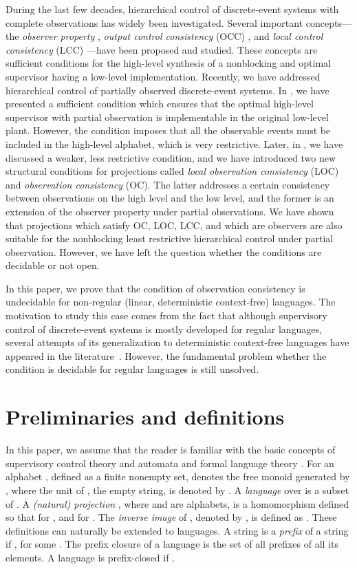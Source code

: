 \documentclass[preprint,1p,times]{elsarticle}
\begin{document}
  During the last few decades, hierarchical control of discrete-event systems with complete observations has widely been investigated. Several important concepts---the {\em observer property\/} \cite{WW96}, {\em output control consistency\/} (OCC) \cite{WZ91}, and {\em local control consistency\/} (LCC) \cite{SB08}---have been proposed and studied. These concepts are sufficient conditions for the high-level synthesis of a nonblocking and optimal supervisor having a low-level implementation. Recently, we have addressed hierarchical control of partially observed discrete-event systems. In \cite{KM10}, we have presented a sufficient condition which ensures that the optimal high-level supervisor with partial observation is implementable in the original low-level plant. However, the condition imposes that all the observable events must be included in the high-level alphabet, which is very restrictive. Later, in \cite{cdc-ecc2011}, we have discussed a weaker, less restrictive condition, and we have introduced two new structural conditions for projections called {\em local observation consistency\/} (LOC) and {\em observation consistency\/} (OC). The latter addresses a certain consistency between observations on the high level and the low level, and the former is an extension of the observer property under partial observations. We have shown that projections which satisfy OC, LOC, LCC, and which are observers are also suitable for the nonblocking least restrictive hierarchical control under partial observation. However, we have left the question whether the conditions are decidable or not open. 
  
  In this paper, we prove that the condition of observation consistency is undecidable for non-regular (linear, deterministic context-free) languages. The motivation to study this case comes from the fact that although supervisory control of discrete-event systems is mostly developed for regular languages, several attempts of its generalization to deterministic context-free languages have appeared in the literature~\cite{gri07,gri10}. However, the fundamental problem whether the condition is decidable for regular languages is still unsolved.


\section{Preliminaries and definitions}
	In this paper, we assume that the reader is familiar with the basic concepts of supervisory control theory \cite{CL08} and automata and formal language theory \cite{salomaa}. For an alphabet , defined as a finite nonempty set,  denotes the free monoid generated by , where the unit of , the empty string, is denoted by . A {\em language\/} over  is a subset of . A {\em (natural) projection\/} , where  and  are alphabets, is a homomorphism defined so that  for , and  for . The {\em inverse image} of , denoted by , is defined as . These definitions can naturally be extended to languages. A string  is a {\em prefix} of a string  if , for some . The prefix closure  of a language  is the set of all prefixes of all its elements. A language  is prefix-closed if .
\end{document}
